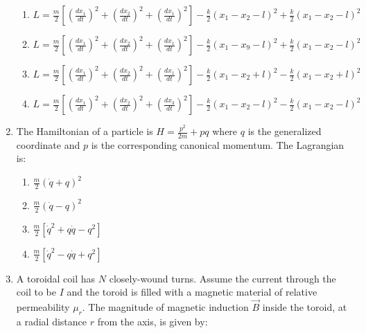 \documentclass[journal,12pt,onecolumn]{IEEEtran}
\begin{document}
\begin{enumerate}[itemsep = 1em]
\hfill{}

\begin{enumerate}
\item $L = \frac{m}{2} \left[ \left( \frac{dx_{1}}{dt} \right)^{2} + \left( \frac{dx_{2}}{dt} \right)^{2} + \left( \frac{dx_{1}}{dt} \right)^{2} \right] 
- \frac{k}{2} \left( x_{1} - x_{2} - l \right)^{2} + \frac{k}{2} \left( x_{1} - x_{2} - l \right)^{2}$

\item $L = \frac{m}{2} \left[ \left( \frac{dx_{1}}{dt} \right)^{2} + \left( \frac{dx_{2}}{dt} \right)^{2} + \left( \frac{dx_{1}}{dt} \right)^{2} \right] 
- \frac{k}{2} \left( x_{1} - x_{9} - l \right)^{2} + \frac{k}{2} \left( x_{1} - x_{2} - l \right)^{2}$

\item $L = \frac{m}{2} \left[ \left( \frac{dx_{1}}{dt} \right)^{2} + \left( \frac{dx_{2}}{dt} \right)^{2} + \left( \frac{dx_{1}}{dt} \right)^{2} \right] 
- \frac{k}{2} \left( x_{1} - x_{2} + l \right)^{2} - \frac{k}{2} \left( x_{1} - x_{2} + l \right)^{2}$

\item $L = \frac{m}{2} \left[ \left( \frac{dx_{1}}{dt} \right)^{2} + \left( \frac{dx_{2}}{dt} \right)^{2} + \left( \frac{dx_{3}}{dt} \right)^{2} \right] 
- \frac{k}{2} \left( x_{1} - x_{2} - l \right)^{2} - \frac{k}{2} \left( x_{1} - x_{2} - l \right)^{2}$
\end{enumerate}

\item The Hamiltonian of a particle is $H = \frac{p^{2}}{2m} + pq$ where $q$ is the generalized coordinate and $p$ is the corresponding canonical momentum. The Lagrangian is:

\hfill{}

\begin{enumerate}
\item $\frac{m}{2} \left( \dot{q} + q \right)^{2}$
\item $\frac{m}{2} \left( \dot{q} - q \right)^{2}$
\item $\frac{m}{2} \left[ \dot{q}^{2} + q \dot{q} - q^{2} \right]$
\item $\frac{m}{2} \left[ \dot{q}^{2} - q \dot{q} + q^{2} \right]$
\end{enumerate}

\item A toroidal coil has $N$ closely-wound turns. Assume the current through the coil to be $I$ and the toroid is filled with a magnetic material of relative permeability $\mu_{r}$. The magnitude of magnetic induction $\vec{B}$ inside the toroid, at a radial distance $r$ from the axis, is given by:


\end{enumerate}
\end{document}
